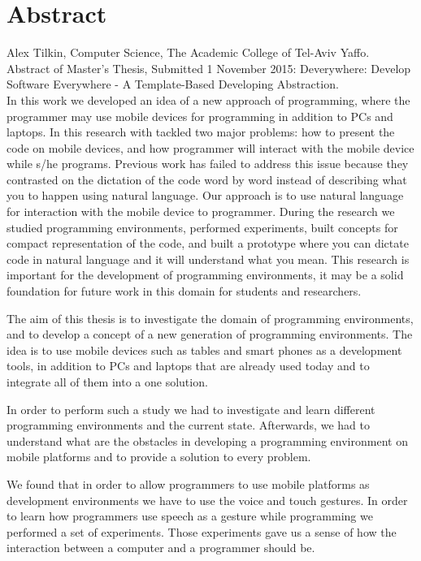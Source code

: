 \section*{Abstract}
Alex Tilkin, Computer Science, The Academic College of Tel-Aviv Yaffo.\\
Abstract of Master’s Thesis, Submitted 1 November 2015:
Deverywhere: Develop Software Everywhere - A Template-Based Developing Abstraction.\\

In this work we developed an idea of a new approach of programming, where the programmer may use mobile devices for programming in addition to PCs and laptops. In this research with tackled two major problems: how to present the code on mobile devices, and how programmer will interact with the mobile device while s/he programs. Previous work has failed to address this issue because they contrasted on the dictation of the code word by word instead of describing what you to happen using natural language. Our approach is to use natural language for interaction with the mobile device to programmer. During the research we studied programming environments, performed experiments, built concepts for compact representation of the code, and built a prototype where you can dictate code in natural language and it will understand what you mean. This research is important for the development of programming environments, it may be a solid foundation for future work in this domain for students and researchers.

The aim of this thesis is to investigate the domain of programming environments, and to develop a concept of a new generation of programming environments. The idea is to use mobile devices such as tables and smart phones as a development tools, in addition to PCs and laptops that are already used today and to integrate all of them into a one solution.

In order to perform such a study we had to investigate and learn different programming environments and the current state. Afterwards, we had to understand what are the obstacles in developing a programming environment on mobile platforms and to provide a solution to every problem. 

We found that in order to allow programmers to use mobile platforms as development environments we have to use the voice and touch gestures. In order to learn how programmers use speech as a gesture while programming we performed a set of experiments. Those experiments gave us a sense of how the interaction between a computer and a programmer should be.

